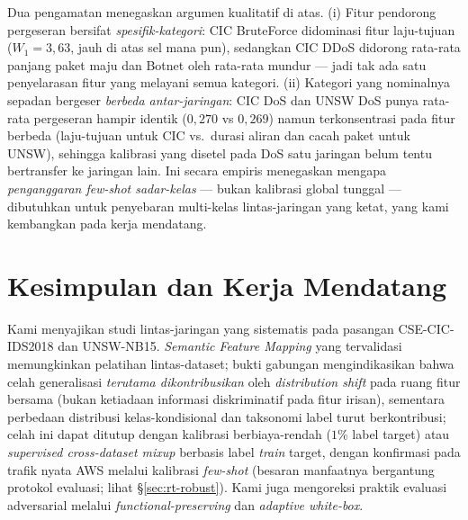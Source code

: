 \documentclass[11pt,a4paper]{article}
\begin{document}
Dua pengamatan menegaskan argumen kualitatif di atas. (i) Fitur pendorong
pergeseran bersifat \emph{spesifik-kategori}: CIC BruteForce didominasi fitur
laju-tujuan ($W_1\!=\!3{,}63$, jauh di atas sel mana pun), sedangkan CIC DDoS
didorong rata-rata panjang paket maju dan Botnet oleh rata-rata mundur --- jadi
tak ada satu penyelarasan fitur yang melayani semua kategori. (ii) Kategori yang
nominalnya sepadan bergeser \emph{berbeda antar-jaringan}: CIC DoS dan UNSW DoS
punya rata-rata pergeseran hampir identik ($0{,}270$ vs $0{,}269$) namun
terkonsentrasi pada fitur berbeda (laju-tujuan untuk CIC vs.\ durasi aliran dan
cacah paket untuk UNSW), sehingga kalibrasi yang disetel pada DoS satu jaringan
belum tentu bertransfer ke jaringan lain. Ini secara empiris menegaskan mengapa
\emph{penganggaran few-shot sadar-kelas} --- bukan kalibrasi global tunggal ---
dibutuhkan untuk penyebaran multi-kelas lintas-jaringan yang ketat, yang kami
kembangkan pada kerja mendatang.

\section{Kesimpulan dan Kerja Mendatang}
\label{sec:conclusion}

Kami menyajikan studi lintas-jaringan yang sistematis pada pasangan CSE-CIC-IDS2018
dan UNSW-NB15. \emph{Semantic Feature Mapping} yang tervalidasi memungkinkan
pelatihan lintas-dataset; bukti gabungan mengindikasikan bahwa celah generalisasi
\emph{terutama dikontribusikan} oleh \emph{distribution shift} pada ruang fitur
bersama (bukan ketiadaan informasi diskriminatif pada fitur irisan), sementara
perbedaan distribusi kelas-kondisional dan taksonomi label turut berkontribusi;
celah ini dapat ditutup dengan kalibrasi berbiaya-rendah ($1\%$ label target) atau
\emph{supervised cross-dataset mixup} berbasis label \emph{train} target, dengan
konfirmasi pada trafik nyata AWS melalui kalibrasi \emph{few-shot} (besaran manfaatnya
bergantung protokol evaluasi; lihat \S\ref{sec:rt-robust}).\ifadversarial{} Kami juga mengoreksi praktik
evaluasi adversarial melalui \emph{functional-preserving} dan
\emph{adaptive white-box}.\fi
\end{document}
